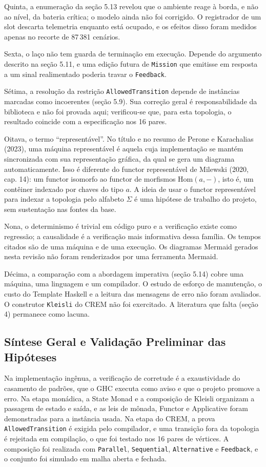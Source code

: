\documentclass[12pt,a4paper]{article}
\begin{document}
Quinta, a enumeração da seção 5.13 revelou que o ambiente reage à borda, e não ao nível, da bateria crítica; o modelo ainda não foi corrigido. O registrador de um slot descarta telemetria enquanto está ocupado, e os efeitos disso foram medidos apenas no recorte de 87\,381 cenários.

Sexta, o laço não tem guarda de terminação em execução. Depende do argumento descrito na seção 5.11, e uma edição futura de \texttt{Mission} que emitisse em resposta a um sinal realimentado poderia travar o \texttt{Feedback}.

Sétima, a resolução da restrição \texttt{AllowedTransition} depende de instâncias marcadas como incoerentes (seção 5.9). Sua correção geral é responsabilidade da biblioteca e não foi provada aqui; verificou-se que, para esta topologia, o resultado coincide com a especificação nos 16 pares.

Oitava, o termo ``representável''. No título e no resumo de Perone e Karachalias (2023), uma máquina representável é aquela cuja implementação se mantém sincronizada com sua representação gráfica, da qual se gera um diagrama automaticamente. Isso é diferente do functor representável de Milewski (2020, cap. 14): um functor isomorfo ao functor de morfismos $\mathrm{Hom}(a, -)$, isto é, um contêiner indexado por chaves do tipo $a$. A ideia de usar o functor representável para indexar a topologia pelo alfabeto $\Sigma$ é uma hipótese de trabalho do projeto, sem sustentação nas fontes da base.

Nona, o determinismo é trivial em código puro e a verificação existe como regressão; a causalidade é a verificação mais informativa dessa família. Os tempos citados são de uma máquina e de uma execução. Os diagramas Mermaid gerados nesta revisão não foram renderizados por uma ferramenta Mermaid.

Décima, a comparação com a abordagem imperativa (seção 5.14) cobre uma máquina, uma linguagem e um compilador. O estudo de esforço de manutenção, o custo do Template Haskell e a leitura das mensagens de erro não foram avaliados. O construtor \texttt{Kleisli} do CREM não foi exercitado. A literatura que falta (seção 4) permanece como lacuna.

\subsection{Síntese Geral e Validação Preliminar das Hipóteses}

Na implementação ingênua, a verificação de corretude é a exaustividade do casamento de padrões, que o GHC executa como aviso e que o projeto promove a erro. Na etapa monádica, a State Monad e a composição de Kleisli organizam a passagem de estado e saída, e as leis de mônada, Functor e Applicative foram demonstradas para a instância usada. Na etapa do CREM, a prova \texttt{AllowedTransition} é exigida pelo compilador, e uma transição fora da topologia é rejeitada em compilação, o que foi testado nos 16 pares de vértices. A composição foi realizada com \texttt{Parallel}, \texttt{Sequential}, \texttt{Alternative} e \texttt{Feedback}, e o conjunto foi simulado em malha aberta e fechada.
\end{document}
